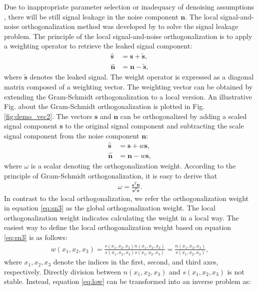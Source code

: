 Due to inappropriate parameter selection or inadequacy of denoising assumptions \cite{yangkang2015ortho},  there will be still signal leakage in the noise component $\mathbf{n}$. The local signal-and-noise orthogonalization method was developed by \cite{yangkang2015ortho} to solve the signal leakage problem. The principle of the local signal-and-noise orthogonalization is to apply a weighting operator to retrieve the leaked signal component:
\begin{align}
\label{eq:sn1}
\hat{\mathbf{s}} &= \mathbf{s} + \tilde{\mathbf{s}},\\
\hat{\mathbf{n}} &= \mathbf{n} -  \tilde{\mathbf{s}},
\end{align}
where $\tilde{\mathbf{s}}$ denotes the leaked signal. The weight operator is expressed as a diagonal matrix composed of a weighting vector. The weighting vector can be obtained by extending the Gram-Schmidt orthogonalization \cite{gram} to a local version. An illustrative Fig. about the Gram-Schmidt orthogonalization is plotted in Fig. \ref{fig:demo_vec2}.  The vectors $\mathbf{s}$ and $\mathbf{n}$ can be orthogonalized by adding a scaled signal component $\mathbf{s}$ to the original signal component and subtracting the scale signal component from the noise component $\mathbf{n}$:
\begin{align}
\label{eq:sn2}
\hat{\mathbf{s}} &= \mathbf{s} + w\mathbf{s},\\
\label{eq:snn2}
\hat{\mathbf{n}} &= \mathbf{n} - w\mathbf{s},
\end{align}
where $\omega$ is a scalar denoting the orthogonalization weight. According to the principle of Gram-Schmidt orthogonalization, it is easy to derive that 
\begin{align}
\label{eq:sn3}
\omega=\frac{\mathbf{s}^T\mathbf{n}}{\mathbf{s}^T\mathbf{s}}.
\end{align}
In contrast to the local orthogonalization, we refer the orthogonalization weight in equation \ref{eq:sn3} as the global orthogonalization weight. The local orthogonalization weight indicates calculating the weight in a local way. The easiest way to define the local orthogonalization weight based on equation \ref{eq:sn3} is as follows:
\begin{align}
\label{eq:low}
w(x_1,x_2,x_3)=\frac{s(x_1,x_2,x_3)n(x_1,x_2,x_3)}{s(x_1,x_2,x_3)s(x_1,x_2,x_3)}=\frac{n(x_1,x_2,x_3)}{s(x_1,x_2,x_3)},
\end{align}
where $x_1,x_2,x_3$ denote the indices in the first, second, and third axes, respectively. Directly division between $n(x_1,x_2,x_3)$ and $s(x_1,x_2,x_3)$ is not stable. Instead, equation \ref{eq:low} can be transformed into an inverse problem as:
